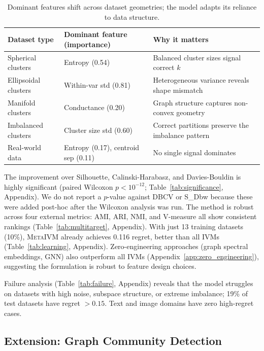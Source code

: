 \documentclass[10pt]{article} %
\newcommand{\ours}{\textsc{MetaIVM}}
\begin{document}
\begin{table}[t]
\centering
\caption{Dominant features shift across dataset geometries; the model adapts its reliance to data structure.}
\label{tab:adaptive}
\small
\begin{tabular}{llp{5.5cm}}
\toprule
\textbf{Dataset type} & \textbf{Dominant feature (importance)} & \textbf{Why it matters} \\
\midrule
Spherical clusters & Entropy (0.54) & Balanced cluster sizes signal correct $k$ \\
Ellipsoidal clusters & Within-var std (0.81) & Heterogeneous variance reveals shape mismatch \\
Manifold clusters & Conductance (0.20) & Graph structure captures non-convex geometry \\
Imbalanced clusters & Cluster size std (0.60) & Correct partitions preserve the imbalance pattern \\
Real-world data & Entropy (0.17), centroid sep (0.11) & No single signal dominates \\
\bottomrule
\end{tabular}
\end{table}

The improvement over Silhouette, Calinski-Harabasz, and Davies-Bouldin is highly significant (paired Wilcoxon $p < 10^{-12}$; Table~\ref{tab:significance}, Appendix). We do not report a $p$-value against DBCV or S\_Dbw because these were added post-hoc after the Wilcoxon analysis was run. The method is robust across four external metrics: AMI, ARI, NMI, and V-measure all show consistent rankings (Table~\ref{tab:multitarget}, Appendix). With just 13 training datasets (10\%), \ours{} already achieves 0.116 regret, better than all IVMs (Table~\ref{tab:learning}, Appendix). Zero-engineering approaches (graph spectral embeddings, GNN) also outperform all IVMs (Appendix~\ref{app:zero_engineering}), suggesting the formulation is robust to feature design choices.

Failure analysis (Table~\ref{tab:failure}, Appendix) reveals that the model struggles on datasets with high noise, subspace structure, or extreme imbalance; 19\% of test datasets have regret $> 0.15$. Text and image domains have zero high-regret cases.


\subsection{Extension: Graph Community Detection}
\label{sec:graph_community}
\end{document}
